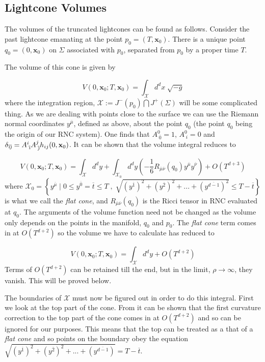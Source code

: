 \documentclass[12pt]{article}
\newcommand{\be}{\begin{equation}}
\newcommand{\ee}{\end{equation}}
\begin{document}
\subsection{Lightcone Volumes}

The volumes of the truncated lightcones can be found as follows. Consider the past lightcone emanating at the point $p_0=(T,\mathbf x_0)$. There is a unique point $q_0=(0,\mathbf x_0)$ on $\Sigma$ associated with $p_0$, separated from $p_0$ by a proper time $T$. 

The volume of this cone is given by

\be\label{eq:VolumeWithNoSimplifications}
V(0,\mathbf{x}_0;T,\mathbf{x}_0)=\int_{\mathcal{X}} d^d x\;\sqrt{-g}
\ee
where the integration region, $\mathcal{X}:= J^-(p_0)\bigcap J^+(\Sigma)$ will be some complicated thing. As we are dealing with points close to the surface we can use the  Riemann normal coordinates $y^{\overline{\mu}}$, defined as above, about the point $q_0$ (the point $q_0$ being the origin of our RNC system). One finds that $A^0_{\;\overline{0}}=1$, $A^0_{\;i}=0$ and $\delta_{\overline{\emph\i}\overline{\emph\j}}=A^i_{\;\overline{\emph\i}}A^j_{\;\overline{\emph\j}}h_{ij}(0,\mathbf{x}_0)$. It can be shown that the volume integral reduces to \cite{Khetrapal_Sumati:Causal_Diamond_Volume}

\be\label{eq:VolumeWithRNC}
V(0,\mathbf{x}_0;T,\mathbf{x}_0) =\int_{\mathcal{X}}d^dy+\int_{\mathcal{X}_0}d^dy\left(-\frac{1}{6}R_{\overline{\mu}\overline{\nu}}(q_0)y^{\overline{\mu}}y^{\overline{\nu}} \right)+O(T^{d+3})
\ee
where $\mathcal{X}_0=\left\lbrace y^{\overline{\mu}} \mid 0\leq y^{\overline{0}}=\overline{t}\leq T\; ,\; \sqrt{(y^{\overline{1}})^2+(y^{\overline{2}})^2+...+(y^{\overline{d-1}})^2}\leq T-\overline{t} \right\rbrace$ is what we call the \textit{flat cone}, and $R_{\overline{\mu}\overline{\nu}}(q_0)$ is the Ricci tensor in RNC evaluated at $q_0$. The arguments of the volume function need not be changed as the volume only depends on the points in the manifold, $q_0$ and $p_0$. The \textit{flat cone} term comes in at $O(T^{d+2})$ so the volume we have to calculate has reduced to

\be\label{eq:VolumeToLowestOrder}
V(0,\mathbf{x}_0;T,\mathbf{x}_0) =\int_{\mathcal{X}}d^dy+O(T^{d+2})
\ee
Terms of $O(T^{d+2})$ can be retained till the end, but in the limit, $\rho\rightarrow\infty$, they vanish. This will be proved below.

The boundaries of $\mathcal{X}$ must now be figured out in order to do this integral. First we look at the top part of the cone. From \cite{Khetrapal_Sumati:Causal_Diamond_Volume} it can be shown that the first curvature correction to the top part of the cone comes in at $O(T^{d+2})$ and so can be ignored for our purposes. This means that the top can be treated as a that of a \textit{flat cone} and so points on the boundary obey the equation $\sqrt{(y^{\overline{1}})^2+(y^{\overline{2}})^2+...+(y^{\overline{d-1}})} = T-\overline{t}$.
\end{document}
